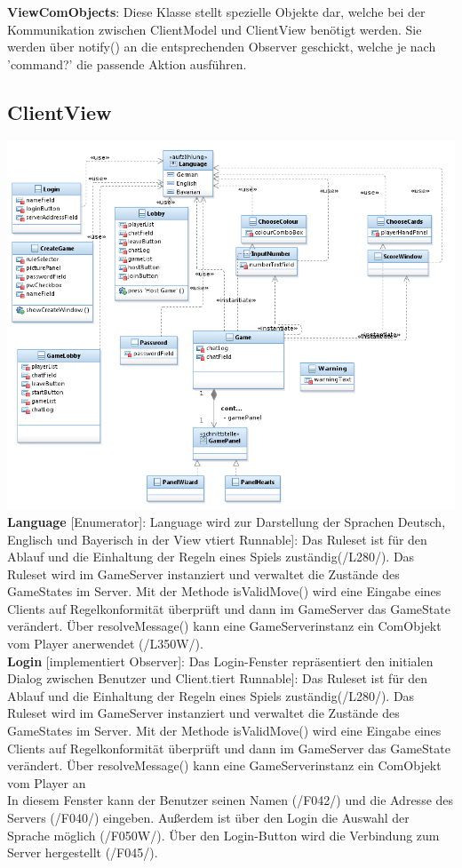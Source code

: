 \documentclass{article}
\begin{document}
\textbf{ViewComObjects}: Diese Klasse stellt spezielle Objekte dar, welche bei der Kommunikation zwischen ClientModel und ClientView benötigt werden. Sie werden über notify() an die entsprechenden Observer geschickt, welche je nach 'command?' die passende Aktion ausführen.

\subsection{ClientView}
\includegraphics[width=\textwidth]{ClientView}
\textbf{Language} [Enumerator]: Language wird zur Darstellung der Sprachen Deutsch, Englisch und Bayerisch  in der View vtiert Runnable]: Das Ruleset  ist für den Ablauf und die Einhaltung der Regeln eines Spiels zuständig(/L280/). Das Ruleset wird im GameServer instanziert und verwaltet die Zustände des GameStates im Server. Mit der Methode isValidMove() wird eine Eingabe eines Clients auf Regelkonformität überprüft und dann im GameServer  das GameState verändert. Über resolveMessage() kann eine GameServerinstanz ein ComObjekt vom Player anerwendet (/L350W/). \\

\textbf{Login} [implementiert Observer]: Das Login-Fenster repräsentiert den initialen Dialog zwischen Benutzer und Client.tiert Runnable]: Das Ruleset  ist für den Ablauf und die Einhaltung der Regeln eines Spiels zuständig(/L280/). Das Ruleset wird im GameServer instanziert und verwaltet die Zustände des GameStates im Server. Mit der Methode isValidMove() wird eine Eingabe eines Clients auf Regelkonformität überprüft und dann im GameServer  das GameState verändert. Über resolveMessage() kann eine GameServerinstanz ein ComObjekt vom Player an\\
In diesem Fenster kann der Benutzer seinen Namen (/F042/) und die Adresse des Servers (/F040/) eingeben. Außerdem ist über den Login die Auswahl der Sprache möglich (/F050W/). Über den Login-Button wird die Verbindung zum Server hergestellt (/F045/).\\
\end{document}
